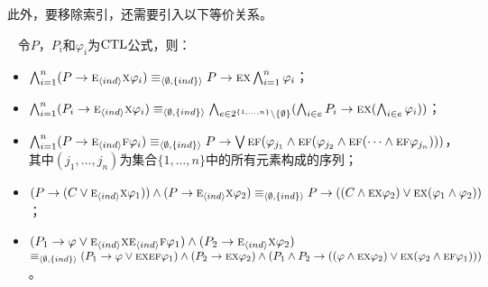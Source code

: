 此外，要移除索引，还需要引入以下等价关系。
\begin{lemma}~\label{lem:In2NI}
	令$P$，$P_i$和$\varphi_i$为$\textrm{CTL}$公式，则：
	\begin{itemize}
		\item $\bigwedge_{i=1}^n (P\rightarrow \textsc{e}_{{\langle{ind}\rangle}} \textsc{x} \varphi_i)  \equiv_{{\langle{\emptyset, \{ind\}}\rangle}} P\rightarrow \textsc{e} \textsc{x} \bigwedge_{i=1}^n \varphi_i$；
		\item $\bigwedge_{i=1}^n (P_i\rightarrow \textsc{e}_{{\langle{ind}\rangle}} \textsc{x} \varphi_i) \equiv_{{\langle{\emptyset, \{ind\}}\rangle}} \bigwedge_{e \in 2^{\{1,\dots, n\}} \setminus \{\emptyset\}}(\bigwedge_{i\in e}P_i\rightarrow \textsc{e} \textsc{x} (\bigwedge_{i\in e}\varphi_i))$；
		\item $\bigwedge_{i=1}^n (P\rightarrow \textsc{e}_{{\langle{ind}\rangle}} \textsc{f} \varphi_i)  \equiv_{{\langle{\emptyset, \{ind\}}\rangle}} P\rightarrow \bigvee\textsc{e}\textsc{f} (\varphi_{j_1} \wedge \textsc{e}\textsc{f}(\varphi_{j_2} \wedge \textsc{e}\textsc{f}(\dots \wedge \textsc{e}\textsc{f} \varphi_{j_n})))$，其中$(j_1, \dots, j_n)$为集合$\{1, \dots, n\}$中的所有元素构成的序列；
		\item $(P\rightarrow (C \vee \textsc{e}_{{\langle{ind}\rangle}} \textsc{x} \varphi_1)) \wedge (P \rightarrow \textsc{e}_{{\langle{ind}\rangle}} \textsc{x} \varphi_2) \equiv_{{\langle{\emptyset, \{ind\}}\rangle}} P \rightarrow ((C \wedge \textsc{e} \textsc{x} \varphi_2) \vee \textsc{e} \textsc{x} (\varphi_1 \wedge \varphi_2))$；
		\item $(P_1 \rightarrow \varphi \vee \textsc{e}_{{\langle{ind}\rangle}}\textsc{x} \textsc{e}_{{\langle{ind}\rangle}}\textsc{f} \varphi_1) \wedge (P_2 \rightarrow \textsc{e}_{{\langle{ind}\rangle}}\textsc{x} \varphi_2)$ $\equiv_{{\langle{\emptyset, \{ind\}}\rangle}} (P_1 \rightarrow \varphi \vee \textsc{e} \textsc{x} \textsc{e} \textsc{f} \varphi_1) \wedge (P_2 \rightarrow \textsc{e} \textsc{x} \varphi_2) \wedge (P_1 \wedge P_2 \rightarrow ((\varphi \wedge \textsc{e} \textsc{x} \varphi_2) \vee \textsc{e} \textsc{x} (\varphi_2 \wedge \textsc{e} \textsc{f} \varphi_1)))$。
	\end{itemize}
\end{lemma}
